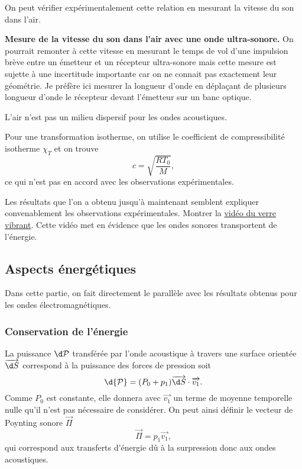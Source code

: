 On peut vérifier expérimentalement cette relation en mesurant la vitesse du son dans l'air.
\begin{experience}
\textbf{Mesure de la vitesse du son dans l'air avec une onde ultra-sonore.}
On pourrait remonter à cette vitesse en mesurant le temps de vol d'une impulsion brève entre un émetteur et un récepteur ultra-sonore mais cette mesure est sujette à une incertitude importante car on ne connait pas exactement leur géométrie.
Je préfère ici mesurer la longueur d'onde en déplaçant de plusieurs longueur d'onde le récepteur devant l'émetteur sur un banc optique.
\end{experience}

\begin{remarque}
L'air n'est pas un milieu dispersif pour les ondes acoustiques.
\end{remarque}
\begin{remarque}
Pour une transformation isotherme, on utilise le coefficient de compressibilité isotherme $\chi_T$ et on trouve
\begin{equation*}
c = \sqrt{\frac{RT_0}{M}},
\end{equation*}
ce qui n'est pas en accord avec les observations expérimentales.
\end{remarque}

\begin{transition}
Les résultats que l'on a obtenu jusqu'à maintenant semblent expliquer convenablement les observations expérimentales.
Montrer la \href{https://www.youtube.com/watch?v=7cgZcbHmxm4&feature=youtu.be}{vidéo du verre vibrant}.
Cette vidéo met en évidence que les ondes sonores transportent de l'énergie.
\end{transition}

\subsection{Aspects énergétiques}

Dans cette partie, on fait directement le parallèle avec les résultats obtenus pour les ondes électromagnétiques.

\subsubsection{Conservation de l'énergie}

La puissance $\d\cal{P}$ transférée par l'onde acoustique à travers une surface orientée $\overrightarrow{\d S}$ correspond à la puissance des forces de pression soit
\begin{equation*}
\d {\cal{P}} = (P_0+p_1) \overrightarrow{\d S} \cdot \overrightarrow{v_1}.
\end{equation*}
Comme $P_0$ est constante, elle donnera avec $\overrightarrow{v_1}$ un terme de moyenne temporelle nulle qu'il n'est pas nécessaire de considérer.
On peut ainsi définir le vecteur de Poynting sonore $\overrightarrow{\Pi}$
\begin{equation}
\overrightarrow{\Pi} = p_1\overrightarrow{v_1},
\end{equation}
qui correspond aux transferts d'énergie dû à la surpression donc aux ondes acoustiques.

